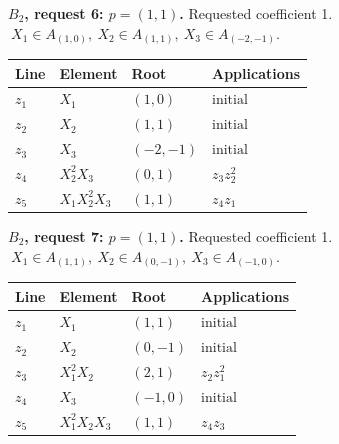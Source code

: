 \par\medskip\noindent\begin{minipage}{\textwidth}
\textbf{\(B_2\), request 6: \(p=(1,1)\).} Requested coefficient 1.
\(\ X_1\in A_{(1,0)},\ X_2\in A_{(1,1)},\ X_3\in A_{(-2,-1)}.\)\par
\smallskip\centering\small\begin{tabular}{@{}llll@{}}\toprule
Line & Element & Root & Applications\\\midrule
\(z_{1}\) & \(X_1\) & \((1,0)\) & \(\text{initial}\) \\
\(z_{2}\) & \(X_2\) & \((1,1)\) & \(\text{initial}\) \\
\(z_{3}\) & \(X_3\) & \((-2,-1)\) & \(\text{initial}\) \\
\(z_{4}\) & \(X_2^{2}X_3\) & \((0,1)\) & \(z_{3}z_{2}^{2}\) \\
\(z_{5}\) & \(X_1X_2^{2}X_3\) & \((1,1)\) & \(z_{4}z_{1}\) \\
\bottomrule\end{tabular}\end{minipage}\par
\par\medskip\noindent\begin{minipage}{\textwidth}
\textbf{\(B_2\), request 7: \(p=(1,1)\).} Requested coefficient 1.
\(\ X_1\in A_{(1,1)},\ X_2\in A_{(0,-1)},\ X_3\in A_{(-1,0)}.\)\par
\smallskip\centering\small\begin{tabular}{@{}llll@{}}\toprule
Line & Element & Root & Applications\\\midrule
\(z_{1}\) & \(X_1\) & \((1,1)\) & \(\text{initial}\) \\
\(z_{2}\) & \(X_2\) & \((0,-1)\) & \(\text{initial}\) \\
\(z_{3}\) & \(X_1^{2}X_2\) & \((2,1)\) & \(z_{2}z_{1}^{2}\) \\
\(z_{4}\) & \(X_3\) & \((-1,0)\) & \(\text{initial}\) \\
\(z_{5}\) & \(X_1^{2}X_2X_3\) & \((1,1)\) & \(z_{4}z_{3}\) \\
\bottomrule\end{tabular}\end{minipage}\par
